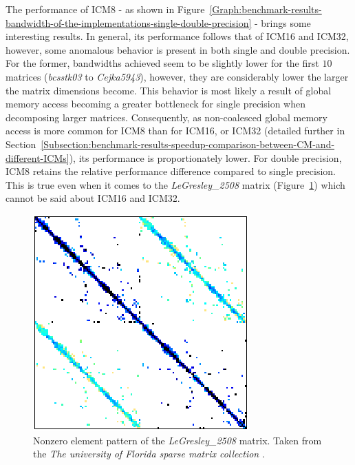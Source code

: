 The performance of ICM8 - as shown in Figure~\ref{Graph:benchmark-results-bandwidth-of-the-implementations-single-double-precision} - brings some interesting results. In general, its performance follows that of ICM16 and ICM32, however, some anomalous behavior is present in both single and double precision. For the former, bandwidths achieved seem to be slightly lower for the first $ 10 $ matrices (\textit{bcsstk03} to \textit{Cejka5943}), however, they are considerably lower the larger the matrix dimensions become. This behavior is most likely a result of global memory access becoming a greater bottleneck for single precision when decomposing larger matrices. Consequently, as non-coalesced global memory access is more common for ICM8 than for ICM16, or ICM32 (detailed further in Section~\ref{Subsection:benchmark-results-speedup-comparison-between-CM-and-different-ICMs}), its performance is proportionately lower. For double precision, ICM8 retains the relative performance difference compared to single precision. This is true even when it comes to the \textit{LeGresley\_2508} matrix (Figure~\ref{Figure:benchmark-results-bandwidth-of-the-implementations-matrix-legresley_2508}) which cannot be said about ICM16 and ICM32.

\begin{figure}
	\centering
	\includegraphics[width=.35\textwidth, keepaspectratio, clip]{images/ch3/matrices/legresley_2508.png}
	\caption{Nonzero element pattern of the \mbox{\textit{LeGresley\_2508}} matrix. Taken from the \emph{The university of Florida sparse matrix collection} \cite{Davis2011}.}
	\label{Figure:benchmark-results-bandwidth-of-the-implementations-matrix-legresley_2508}
\end{figure}

